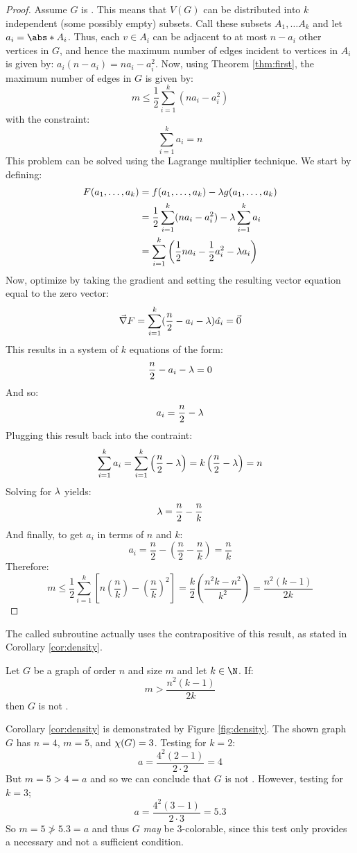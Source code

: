 \begin{proof}
  Assume \(G\) is .  This means that \(V(G)\) can be distributed into \(k\) independent (some possibly
  empty) subsets.  Call these subsets \(A_1,\ldots A_k\) and let \(a_i=\abs*{A_i}\).  Thus, each \(v\in A_i\) can
  be adjacent to at most \(n-a_i\) other vertices in \(G\), and hence the maximum number of edges incident to
  vertices in \(A_i\) is given by: \(a_i(n-a_i)=na_i-a_i^2\).  Now, using Theorem \ref{thm:first}, the maximum
  number of edges in \(G\) is given by:
  \[m\le\frac{1}{2}\sum_{i=1}^k(na_i-a_i^2)\]
  with the constraint:
  \[\sum_{i=1}^ka_i=n\]
  This problem can be solved using the Lagrange multiplier technique.  We start by defining:
  \begin{align*}
    F(a_1,\ldots,a_k) &= f(a_1,\ldots,a_k)-\lambda g(a_1,\ldots,a_k) \\
    &= \frac{1}{2}\sum_{i=1}^k(na_i-a_i^2)-\lambda\sum_{i=1}^ka_i \\
    &= \sum_{i=1}^k\left(\frac{1}{2}na_i-\frac{1}{2}a_i^2-\lambda a_i\right)
  \end{align*}
  Now, optimize by taking the gradient and setting the resulting vector equation equal to the zero vector:
  \[\vec{\nabla}F=\sum_{i=1}^k(\frac{n}{2}-a_i-\lambda)\hat{a_i}=\vec{0}\]
  This results in a system of \(k\) equations of the form:
  \[\frac{n}{2}-a_i-\lambda=0\]
  And so:
  \[a_i=\frac{n}{2}-\lambda\]
  Plugging this result back into the contraint:
  \[\sum_{i=1}^ka_i=\sum_{i=1}^k\left(\frac{n}{2}-\lambda\right)=k\left(\frac{n}{2}-\lambda\right)=n\]
  Solving for \(\lambda\) yields:
  \[\lambda=\frac{n}{2}-\frac{n}{k}\]
  And finally, to get \(a_i\) in terms of \(n\) and \(k\):
  \[a_i=\frac{n}{2}-\left(\frac{n}{2}-\frac{n}{k}\right)=\frac{n}{k}\]
  Therefore:
  \[m\le\frac{1}{2}\sum_{i=1}^k\left[n\left(\frac{n}{k}\right)-\left(\frac{n}{k}\right)^2\right]=
  \frac{k}{2}\left(\frac{n^2k-n^2}{k^2}\right)=\frac{n^2(k-1)}{2k}\]
\end{proof}

The called subroutine actually uses the contrapositive of this result, as stated in Corollary \ref{cor:density}.

\begin{corollary}
  \label{cor:density}
  Let \(G\) be a graph of order \(n\) and size \(m\) and let \(k\in\N\).  If:
  \[m>\frac{n^2(k-1)}{2k}\]
  then \(G\) is not .
\end{corollary}

Corollary \ref{cor:density} is demonstrated by Figure \ref{fig:density}.  The shown graph \(G\) has \(n=4\),
\(m=5\), and \(\chi(G)=3\).  Testing for \(k=2\):
\[a=\frac{4^2(2-1)}{2\cdot2}=4\]
But \(m=5>4=a\) and so we can conclude that \(G\) is not .  However, testing for \(k=3\);
\[a=\frac{4^2(3-1)}{2\cdot3}=5.3\]
So \(m=5\ngtr5.3=a\) and thus \(G\) \emph{may} be \(3\)-colorable, since this test only provides a necessary and
not a sufficient condition.

